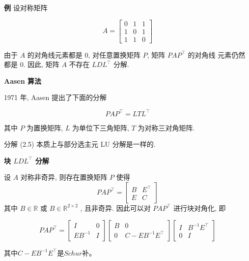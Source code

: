 \documentclass[12pt,a4paper]{article}
\begin{document}
{\bfseries 例} 设对称矩阵

\begin{equation}
A=\left[\begin{array}{lll}{0} & {1} & {1} \\ {1} & {0} & {1} \\ {1} & {1} & {0}\end{array}\right]
\end{equation}

由于 $A$ 的对角线元素都是 $0$, 对任意置换矩阵 $P$, 矩阵 $P AP^{\top}$ 的对角线
元素仍然都是 $0$. 因此, 矩阵 $A$ 不存在 $LDL^{\top}$ 分解.



{\bfseries Aasen 算法}

1971 年, Aasen 提出了下面的分解

\begin{equation}
P A P^{\top}=L T L^{\top}
\end{equation}

其中 $P$ 为置换矩阵, $L$ 为单位下三角矩阵, $T$ 为对称三对角矩阵.

分解 (2.5) 本质上与部分选主元 LU 分解是一样的.

{\bfseries 块 $LDL^{\top}$ 分解} 

设 $A$ 对称非奇异, 则存在置换矩阵 $P$ 使得
\begin{equation}
P A P^{\top}=\left[\begin{array}{cc}{B} & {E^{\top}} \\ {E} & {C}\end{array}\right]
\end{equation}
其中 $B ∈ \mathbb{R}$ 或 $B ∈ \mathbb{R}^{2×2}$
, 且非奇异. 因此可以对 $P AP^{\top}$ 进行块对角化, 即

\begin{equation}
P A P^{\top}=\left[\begin{array}{cc}{I} & {0} \\ {E B^{-1}} & {I}\end{array}\right]\left[\begin{array}{cc}{B} & {0} \\ {0} & {C-E B^{-1} E^{\top}}\end{array}\right]\left[\begin{array}{cc}{I} & {B^{-1} E^{\top}} \\ {0} & {I}\end{array}\right]
\end{equation}

其中$C-E B^{-1} E^{\top}$是$Schur$补。
\end{document}
